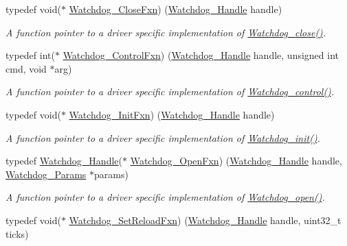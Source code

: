 \begin{DoxyCompactItemize}
typedef void($\ast$ \hyperlink{_watchdog_8h_a2d13686bc3dd7fdb05ec97d63be489ee}{Watchdog\+\_\+\+Close\+Fxn}) (\hyperlink{_watchdog_8h_a00ed22749c947ef200434eeec507f90d}{Watchdog\+\_\+\+Handle} handle)
\begin{DoxyCompactList}\small\item\em A function pointer to a driver specific implementation of \hyperlink{_watchdog_8h_a1c0dfea7011b06f303d01afb631ffbdd}{Watchdog\+\_\+close()}. \end{DoxyCompactList}\item 
typedef int($\ast$ \hyperlink{_watchdog_8h_afb5bd0153345db8f4a7a6a8756b90447}{Watchdog\+\_\+\+Control\+Fxn}) (\hyperlink{_watchdog_8h_a00ed22749c947ef200434eeec507f90d}{Watchdog\+\_\+\+Handle} handle, unsigned int cmd, void $\ast$arg)
\begin{DoxyCompactList}\small\item\em A function pointer to a driver specific implementation of \hyperlink{_watchdog_8h_aa98a75361edb1e476432669169f2950e}{Watchdog\+\_\+control()}. \end{DoxyCompactList}\item 
typedef void($\ast$ \hyperlink{_watchdog_8h_a6401b1a23d9048efb4ed69a074ea60f9}{Watchdog\+\_\+\+Init\+Fxn}) (\hyperlink{_watchdog_8h_a00ed22749c947ef200434eeec507f90d}{Watchdog\+\_\+\+Handle} handle)
\begin{DoxyCompactList}\small\item\em A function pointer to a driver specific implementation of \hyperlink{_watchdog_8h_afaadfb59be17661ae95562f2081355e7}{Watchdog\+\_\+init()}. \end{DoxyCompactList}\item 
typedef \hyperlink{_watchdog_8h_a00ed22749c947ef200434eeec507f90d}{Watchdog\+\_\+\+Handle}($\ast$ \hyperlink{_watchdog_8h_a05ae778da809a34e4d84c95d35ba5f58}{Watchdog\+\_\+\+Open\+Fxn}) (\hyperlink{_watchdog_8h_a00ed22749c947ef200434eeec507f90d}{Watchdog\+\_\+\+Handle} handle, \hyperlink{struct_watchdog___params}{Watchdog\+\_\+\+Params} $\ast$params)
\begin{DoxyCompactList}\small\item\em A function pointer to a driver specific implementation of \hyperlink{_watchdog_8h_aa5ce656aa6d5199e1efdb4ca2cd9fb7c}{Watchdog\+\_\+open()}. \end{DoxyCompactList}\item 
typedef void($\ast$ \hyperlink{_watchdog_8h_aa81bae05dc1321bcc8ebcda8e9116f66}{Watchdog\+\_\+\+Set\+Reload\+Fxn}) (\hyperlink{_watchdog_8h_a00ed22749c947ef200434eeec507f90d}{Watchdog\+\_\+\+Handle} handle, uint32\+\_\+t ticks)

\end{DoxyCompactItemize}
